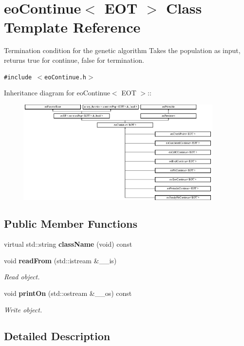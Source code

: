 \section{eo\-Continue$<$ EOT $>$ Class Template Reference}
\label{classeo_continue}
Termination condition for the genetic algorithm Takes the population as input, returns true for continue, false for termination.  


{\tt \#include $<$eo\-Continue.h$>$}

Inheritance diagram for eo\-Continue$<$ EOT $>$::\begin{figure}[H]
\begin{center}
\leavevmode
\includegraphics[height=5.2027cm]{classeo_continue}
\end{center}
\end{figure}
\subsection*{Public Member Functions}
\begin{CompactItemize}
\item 
virtual std::string {\bf class\-Name} (void) const \label{classeo_continue_a0}

\item 
void {\bf read\-From} (std::istream \&\_\-\_\-is)
\begin{CompactList}\small\item\em Read object. \item\end{CompactList}\item 
void {\bf print\-On} (std::ostream \&\_\-\_\-os) const 
\begin{CompactList}\small\item\em Write object. \item\end{CompactList}\end{CompactItemize}


\subsection{Detailed Description}
